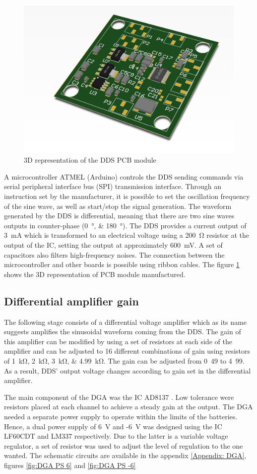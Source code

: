\begin{figure}[!htpb]
	\centering
	\includegraphics[width=7.5 cm,keepaspectratio]{figure_DDS}
	\caption{3D representation of the DDS PCB module}
	\label{fig:3D DDS}
\end{figure}

A microcontroller ATMEL (Arduino) controls the DDS sending commands via serial peripheral interface bus (SPI) transmission interface. Through an instruction set by the manufacturer, it is possible to set the oscillation frequency of the sine wave, as well as start/stop the signal generation. The waveform generated by the DDS is differential, meaning that there are two sine waves outputs in counter-phase (\SIlist{0;180}{\degree}). The DDS provides a current output of \SI{3}{\mA} which is transformed to an electrical voltage using a \SI{200}{\ohm} resistor at the output of the IC, setting the output at approximately \SI{600}{\mV}. A set of capacitors also filters high-frequency noises. The connection between the microcontroller and other boards is possible using ribbon cables. The figure \ref{fig:3D DDS} shows the 3D representation of PCB module manufactured.

\subsection{Differential amplifier gain}
The following stage consists of a differential voltage amplifier which as its name suggests amplifies the sinusoidal waveform coming from the DDS. The gain of this amplifier can be modified by using a set of resistors at each side of the amplifier and can be adjusted to 16 different combinations of gain using resistors of \SIlist{1;2;3;4.99}{\kohm}. The gain can be adjusted from \si{0.49} to \si{4.99}. As a result, DDS’ output voltage changes according to gain set in the differential amplifier. 

The main component of the DGA was the IC AD8137 . Low tolerance were resistors placed at each channel to achieve a steady gain at the output. The DGA needed a separate power supply to operate within the limits of the batteries. Hence, a dual power supply of \SI{6}{\volt} and -\SI{6}{\volt} was designed using the IC LF60CDT and LM337 respectively. Due to the latter is a variable voltage regulator, a set of resistor was used to adjust the level of regulation to the one wanted. The schematic circuits are available in the appendix \ref{Appendix: DGA}, figures \ref{fig:DGA PS 6} and \ref{fig:DGA PS -6}


